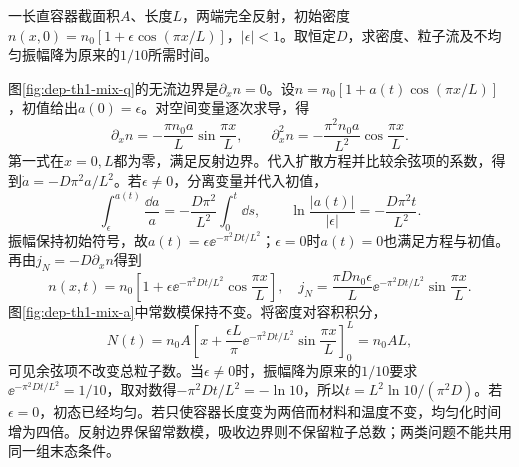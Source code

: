 \begin{example}[封闭容器中的浓度均匀化]
一长直容器截面积$A$、长度$L$，两端完全反射，初始密度$n(x,0)=n_0[1+\epsilon\cos(\pi x/L)]$，$|\epsilon|<1$。取恒定$D$，求密度、粒子流及不均匀振幅降为原来的$1/10$所需时间。
\end{example}
\begin{solution}
图\ref{fig:dep-th1-mix-q}的无流边界是$\partial_xn=0$。设$n=n_0[1+a(t)\cos(\pi x/L)]$，初值给出$a(0)=\epsilon$。对空间变量逐次求导，得
\[
 \partial_xn=-\frac{\pi n_0a}{L}\sin\frac{\pi x}{L},\qquad
 \partial_x^2n=-\frac{\pi^2n_0a}{L^2}\cos\frac{\pi x}{L}.
\]
第一式在$x=0,L$都为零，满足反射边界。代入扩散方程并比较余弦项的系数，得到$\dot a=-D\pi^2a/L^2$。若$\epsilon\ne0$，分离变量并代入初值，
\[
 \int_\epsilon^{a(t)}\frac{\dd a}{a}
 =-\frac{D\pi^2}{L^2}\int_0^t\dd s,
 \qquad
 \ln\frac{|a(t)|}{|\epsilon|}=-\frac{D\pi^2t}{L^2}.
\]
振幅保持初始符号，故$a(t)=\epsilon\ee^{-\pi^2Dt/L^2}$；$\epsilon=0$时$a(t)=0$也满足方程与初值。再由$j_N=-D\partial_xn$得到
\[
 n(x,t)=n_0\left[1+\epsilon\ee^{-\pi^2Dt/L^2}\cos\frac{\pi x}L\right],
 \quad j_N=\frac{\pi Dn_0\epsilon}{L}\ee^{-\pi^2Dt/L^2}\sin\frac{\pi x}L.
\]
图\ref{fig:dep-th1-mix-a}中常数模保持不变。将密度对容积积分，
\[
 N(t)=n_0A\left[x+\frac{\epsilon L}{\pi}
 \ee^{-\pi^2Dt/L^2}\sin\frac{\pi x}{L}\right]_0^L=n_0AL,
\]
可见余弦项不改变总粒子数。当$\epsilon\ne0$时，振幅降为原来的$1/10$要求$\ee^{-\pi^2Dt/L^2}=1/10$，取对数得$-\pi^2Dt/L^2=-\ln10$，所以$t=L^2\ln10/(\pi^2D)$。若$\epsilon=0$，初态已经均匀。若只使容器长度变为两倍而材料和温度不变，均匀化时间增为四倍。反射边界保留常数模，吸收边界则不保留粒子总数；两类问题不能共用同一组末态条件。
\end{solution}
